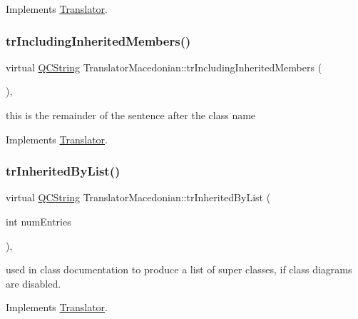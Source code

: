 Implements \mbox{\hyperlink{class_translator}{Translator}}.

\mbox{\label{class_translator_macedonian_ad2757aa6ead81d81ed7f039e9af10013}} 
\subsubsection{\texorpdfstring{trIncludingInheritedMembers()}{trIncludingInheritedMembers()}}
{\footnotesize\ttfamily virtual \mbox{\hyperlink{class_q_c_string}{Q\+C\+String}} Translator\+Macedonian\+::tr\+Including\+Inherited\+Members (\begin{DoxyParamCaption}{ }\end{DoxyParamCaption})\hspace{0.3cm}{\ttfamily [inline]}, {\ttfamily [virtual]}}

this is the remainder of the sentence after the class name 

Implements \mbox{\hyperlink{class_translator}{Translator}}.

\mbox{\label{class_translator_macedonian_a2230f71a04ada8241a13b69816030b8d}} 
\subsubsection{\texorpdfstring{trInheritedByList()}{trInheritedByList()}}
{\footnotesize\ttfamily virtual \mbox{\hyperlink{class_q_c_string}{Q\+C\+String}} Translator\+Macedonian\+::tr\+Inherited\+By\+List (\begin{DoxyParamCaption}\item[{int}]{num\+Entries }\end{DoxyParamCaption})\hspace{0.3cm}{\ttfamily [inline]}, {\ttfamily [virtual]}}

used in class documentation to produce a list of super classes, if class diagrams are disabled. 

Implements \mbox{\hyperlink{class_translator}{Translator}}.

